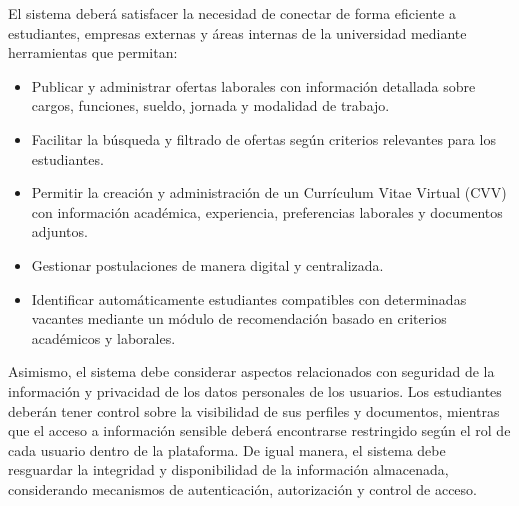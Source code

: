 \documentclass[11pt,a4paper]{Plantilla}
\begin{document}
\vspace{0.3cm}

El sistema deberá satisfacer la necesidad de conectar de forma eficiente a estudiantes, empresas externas y áreas internas de la universidad mediante herramientas que permitan:

\begin{itemize}
\item Publicar y administrar ofertas laborales con información detallada sobre cargos, funciones, sueldo, jornada y modalidad de trabajo.


\vspace{0.2cm}

\item Facilitar la búsqueda y filtrado de ofertas según criterios relevantes para los estudiantes.

\vspace{0.2cm}

\item Permitir la creación y administración de un Currículum Vitae Virtual (CVV) con información académica, experiencia, preferencias laborales y documentos adjuntos.

\vspace{0.2cm}

\item Gestionar postulaciones de manera digital y centralizada.

\vspace{0.2cm}

\item Identificar automáticamente estudiantes compatibles con determinadas vacantes mediante un módulo de recomendación basado en criterios académicos y laborales.

\end{itemize}

\vspace{0.3cm}

Asimismo, el sistema debe considerar aspectos relacionados con seguridad de la información y privacidad de los datos personales de los usuarios. Los estudiantes deberán tener control sobre la visibilidad de sus perfiles y documentos, mientras que el acceso a información sensible deberá encontrarse restringido según el rol de cada usuario dentro de la plataforma. De igual manera, el sistema debe resguardar la integridad y disponibilidad de la información almacenada, considerando mecanismos de autenticación, autorización y control de acceso.

\vspace{0.3cm}
\end{document}
